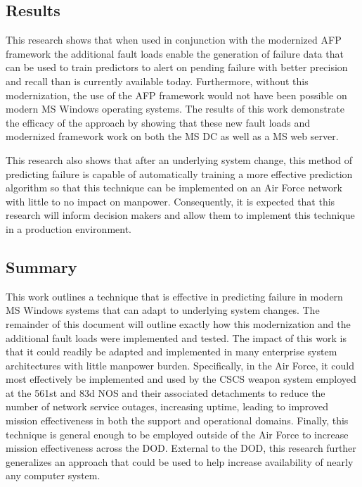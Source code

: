 \subsection{Results}
This research shows that when used in conjunction with the modernized \ac{AFP}
framework the additional fault loads enable the generation of failure data that
can be used to train predictors to alert on pending failure with better
precision and recall than is currently available today.  Furthermore, without
this modernization, the use of the \ac{AFP} framework would not have been
possible on modern \ac{MS} Windows operating systems.  The results of this work
demonstrate the efficacy of the approach by showing that these new fault loads
and modernized framework work on both the \ac{MS} \ac{DC} as well as a \ac{MS}
web server.

This research also shows that after an underlying system change, this
method of predicting failure is capable of automatically training a more
effective prediction algorithm so that this technique can be implemented on an
Air Force network with little to no impact on manpower.  Consequently, it is
expected that this research will inform decision makers and allow them to
implement this technique in a production environment.

\subsection{Summary}
This work outlines a technique that is effective in predicting failure in
modern \ac{MS} Windows systems that can adapt to underlying system changes.
The remainder of this document will outline exactly how this modernization and
the additional fault loads were implemented and tested.  The impact of this
work is that it could readily be adapted and implemented in many enterprise
system architectures with little manpower burden.  Specifically, in the Air
Force, it could most effectively be implemented and used by the \ac{CSCS}
weapon system employed at the 561st and 83d \ac{NOS} and their associated
detachments to reduce the number of network service outages, increasing uptime,
leading to improved mission effectiveness in both the support and operational
domains.  Finally, this technique is general enough to be employed outside of
the Air Force to increase mission effectiveness across the \ac{DOD}.  External
to the \ac{DOD}, this research further generalizes an approach that could be
used to help increase availability of nearly any computer system.
